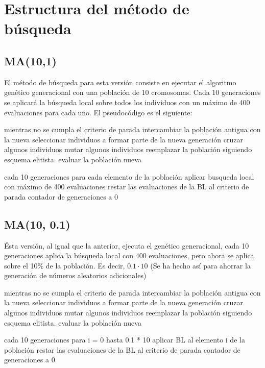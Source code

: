 \documentclass[twoside]{article}
\begin{document}
\section{Estructura del método de búsqueda}

\subsection{MA(10,1)}

El método de búsqueda para esta versión consiste en ejecutar el algoritmo
genético generacional con una población de 10 cromosomas. Cada 10 generaciones
se aplicará la búsqueda local sobre todos los individuos con un máximo de
400 evaluaciones para cada uno. El pseudocódigo es el siguiente:

\begin{pythoncode}
mientras no se cumpla el criterio de parada
    intercambiar la población antigua con la nueva
    seleccionar individuos a formar parte de la nueva generación
    cruzar algunos individuos
    mutar algunos individuos
    reemplazar la población siguiendo esquema elitista.
    evaluar la población nueva

    cada 10 generaciones
        para cada elemento de la población
            aplicar busqueda local con máximo de 400 evaluaciones
            restar las evaluaciones de la BL al criterio de parada
            contador de generaciones a 0
\end{pythoncode}

\subsection{MA(10, 0.1)}

Ésta versión, al igual que la anterior, ejecuta el genético generacional,
cada 10 generaciones aplica la búsqueda local con 400 evaluaciones, pero
ahora se aplica sobre el 10\% de la población. Es decir, $0.1\cdot 10$ (Se
ha hecho así para ahorrar la generación de números aleatorios adicionales)


\begin{pythoncode}
mientras no se cumpla el criterio de parada
    intercambiar la población antigua con la nueva
    seleccionar individuos a formar parte de la nueva generación
    cruzar algunos individuos
    mutar algunos individuos
    reemplazar la población siguiendo esquema elitista.
    evaluar la población nueva

    cada 10 generaciones
        para i = 0 hasta 0.1 * 10
            aplicar BL al elemento i de la población
            restar las evaluaciones de la BL al criterio de parada
            contador de generaciones a 0
\end{pythoncode}
\end{document}
